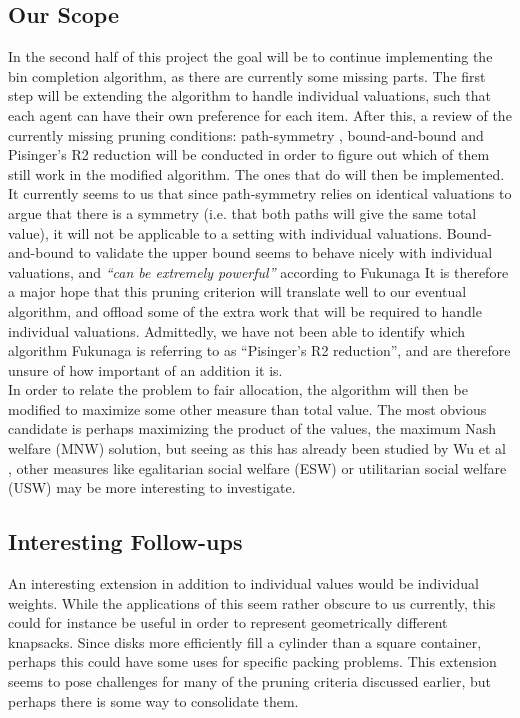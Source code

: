 \documentclass[b5paper]{article}
\begin{document}
\subsection{Our Scope}
In the second half of this project the goal will be to continue implementing the bin completion algorithm, as there are currently some missing parts.
The first step will be extending the algorithm to handle individual valuations, such that each agent can have their own preference for each item.
After this, a review of the currently missing pruning conditions: path-symmetry \cite{fukunaga_branch-and-bound_2011}, bound-and-bound \cite{martello_bound_1981} and Pisinger's R2 reduction
will be conducted in order to figure out which of them still work in the modified algorithm. The ones that do will then be implemented.
It currently seems to us that since path-symmetry relies on identical valuations to argue that there is a symmetry (i.e. that both paths will give the same total value), it will not be applicable to a setting with individual valuations.
Bound-and-bound to validate the upper bound seems to behave nicely with individual valuations, and \emph{``can be extremely powerful''} according to Fukunaga \cite{fukunaga_branch-and-bound_2011} 
It is therefore a major hope that this pruning criterion will translate well to our eventual algorithm, and offload some of the extra work that will be required to handle individual valuations.
Admittedly, we have not been able to identify which algorithm Fukunaga is referring to as ``Pisinger's R2 reduction'', and are therefore unsure of how important of an addition it is.
\\
In order to relate the problem to fair allocation, the algorithm will then be modified to maximize some other measure than total value.
The most obvious candidate is perhaps maximizing the product of the values, the maximum Nash welfare (MNW) solution, but seeing as this has already been studied by Wu et al \cite{wu_budget-feasible_2020},
other measures like egalitarian social welfare (ESW) or utilitarian social welfare (USW) may be more interesting to investigate.

\subsection{Interesting Follow-ups}
An interesting extension in addition to individual values would be individual weights. While the applications of this seem rather obscure to us currently,
this could for instance be useful in order to represent geometrically different knapsacks. Since disks more efficiently fill a cylinder than a square container,
perhaps this could have some uses for specific packing problems.
This extension seems to pose challenges for many of the pruning criteria discussed earlier, but perhaps there is some way to consolidate them.

\printbibliography[heading = bibintoc, title = References]
\end{document}
